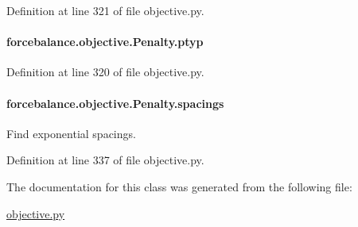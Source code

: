 Definition at line 321 of file objective.\-py.

\hypertarget{classforcebalance_1_1objective_1_1Penalty_aafed9613564329fc6a760aec26a43116}{
\paragraph[{ptyp}]{\setlength{\rightskip}{0pt plus 5cm}forcebalance.\-objective.\-Penalty.\-ptyp}}\label{classforcebalance_1_1objective_1_1Penalty_aafed9613564329fc6a760aec26a43116}


Definition at line 320 of file objective.\-py.

\hypertarget{classforcebalance_1_1objective_1_1Penalty_a9832c430eccb9edf404ba12ed2f54541}{
\paragraph[{spacings}]{\setlength{\rightskip}{0pt plus 5cm}forcebalance.\-objective.\-Penalty.\-spacings}}\label{classforcebalance_1_1objective_1_1Penalty_a9832c430eccb9edf404ba12ed2f54541}


Find exponential spacings. 



Definition at line 337 of file objective.\-py.



The documentation for this class was generated from the following file\-:\begin{DoxyCompactItemize}
\item 
\hyperlink{objective_8py}{objective.\-py}\end{DoxyCompactItemize}
